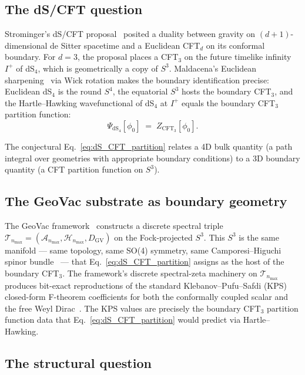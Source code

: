 \documentclass[11pt,a4paper]{article}
\theoremstyle{plain}
\theoremstyle{definition}
\newcommand{\nmax}{n_{\max}}
\newcommand{\sthree}{S^{3}}
\newcommand{\Hilb}{\mathcal{H}}
\newcommand{\Acal}{\mathcal{A}}
\newcommand{\Tcal}{\mathcal{T}}
\newcommand{\DGV}{D_{\mathrm{GV}}}
\begin{document}
\subsection{The dS/CFT question}

Strominger's dS/CFT proposal~\cite{strominger2001} posited a duality
between gravity on $(d+1)$-dimensional de Sitter spacetime and a
Euclidean CFT$_{d}$ on its conformal boundary. For $d = 3$, the
proposal places a CFT$_{3}$ on the future timelike infinity $I^{+}$
of dS$_{4}$, which is geometrically a copy of $\sthree$. Maldacena's
Euclidean sharpening~\cite{maldacena2002} via Wick rotation makes
the boundary identification precise: Euclidean dS$_{4}$ is the round
$S^{4}$, the equatorial $\sthree$ hosts the boundary CFT$_{3}$, and
the Hartle--Hawking wavefunctional of dS$_{4}$ at $I^{+}$ equals the
boundary CFT$_{3}$ partition function:
\begin{equation}
\Psi_{\mathrm{dS}_{4}}[\phi_{0}] \;=\; Z_{\mathrm{CFT}_{3}}[\phi_{0}].
\label{eq:dS_CFT_partition}
\end{equation}

The conjectural Eq.~\eqref{eq:dS_CFT_partition} relates a 4D bulk
quantity (a path integral over geometries with appropriate boundary
conditions) to a 3D boundary quantity (a CFT partition function on
$\sthree$).

\subsection{The GeoVac substrate as boundary geometry}

The GeoVac framework~\cite{paper7, paper38} constructs a discrete
spectral triple
$\Tcal_{\nmax} = (\Acal_{\nmax}, \Hilb_{\nmax}, \DGV)$ on the
Fock-projected $\sthree$. This $\sthree$ is the same manifold ---
same topology, same SO(4) symmetry, same Camporesi--Higuchi
spinor bundle~\cite{camporesi_higuchi1996} --- that
Eq.~\eqref{eq:dS_CFT_partition} assigns as the host of the boundary
CFT$_{3}$. The framework's discrete spectral-zeta machinery on
$\Tcal_{\nmax}$ produces bit-exact reproductions of the standard
Klebanov--Pufu--Safdi (KPS)~\cite{klebanov_pufu_safdi2011} closed-form
F-theorem coefficients for both the conformally coupled scalar and
the free Weyl Dirac~\cite{paper50}. The KPS values are precisely
the boundary CFT$_{3}$ partition function data that
Eq.~\eqref{eq:dS_CFT_partition} would predict via Hartle--Hawking.

\subsection{The structural question}
\end{document}
